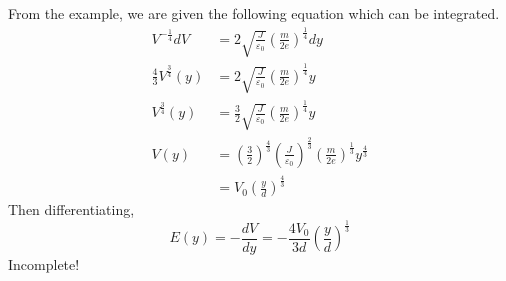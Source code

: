 \documentclass[answers]{exam}
\begin{document}
\begin{questions}
\begin{solution}
    From the example, we are given the following equation which can be integrated.
    \begin{align*}
        V^{-\frac{1}{4}}dV &= 2\sqrt{\frac{J}{\varepsilon_0}}\left(\frac{m}{2e}\right)^{\frac{1}{4}}dy \\
        \frac{4}{3}V^{\frac{3}{4}}(y) &= 2\sqrt{\frac{J}{\varepsilon_0}}\left(\frac{m}{2e}\right)^{\frac{1}{4}}y \\
        V^{\frac{3}{4}}(y) &= \frac{3}{2}\sqrt{\frac{J}{\varepsilon_0}}\left(\frac{m}{2e}\right)^{\frac{1}{4}}y \\
        V(y) &= \left(\frac{3}{2}\right)^{\frac{4}{3}}\left(\frac{J}{\varepsilon_0}\right)^{\frac{2}{3}}\left(\frac{m}{2e}\right)^{\frac{1}{3}}y^{\frac{4}{3}} \\
             &= V_0\left(\frac{y}{d}\right)^{\frac{4}{3}}
    \end{align*}
    Then differentiating,
    $$E(y) = -\frac{dV}{dy} = -\frac{4V_0}{3d}\left(\frac{y}{d}\right)^{\frac{1}{3}}$$
    Incomplete!
\end{solution}

\end{questions}
\end{document}
